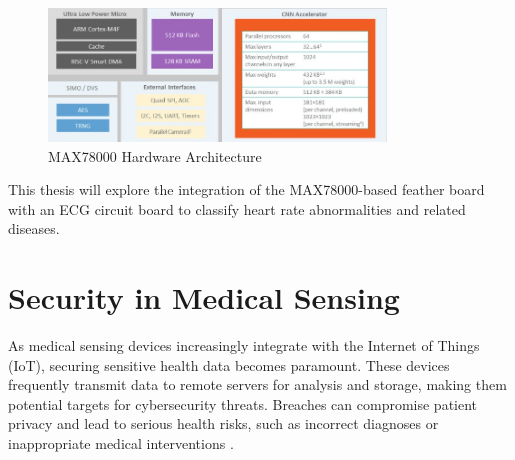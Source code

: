\begin{figure}[h]
	\centering
	\includegraphics[width=0.8\textwidth]{images/max78000arch}
	\caption{MAX78000 Hardware Architecture~\cite{analog-devices-max78000-app-note}}
	\label{fig:max78000_hardware}
\end{figure}

\noindent This thesis will explore the integration of the MAX78000-based feather board with an ECG circuit board to classify heart rate abnormalities and related diseases.\\

\section{Security in Medical Sensing}
\vspace{1em}
\noindent As medical sensing devices increasingly integrate with the Internet of Things (IoT), securing sensitive health data becomes paramount. These devices frequently transmit data to remote servers for analysis and storage, making them potential targets for cybersecurity threats. Breaches can compromise patient privacy and lead to serious health risks, such as incorrect diagnoses or inappropriate medical interventions \cite{Paul2023, Abdunabi2023}.

